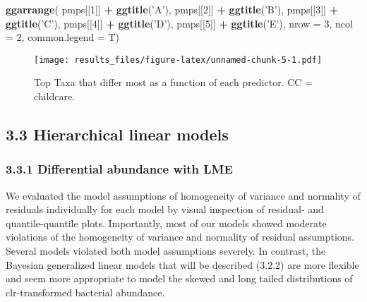 \documentclass[]{article}
\newenvironment{Shaded}{\begin{snugshade}}{\end{snugshade}}
\newcommand{\KeywordTok}[1]{\textcolor[rgb]{0.13,0.29,0.53}{\textbf{#1}}}
\newcommand{\DataTypeTok}[1]{\textcolor[rgb]{0.13,0.29,0.53}{#1}}
\newcommand{\DecValTok}[1]{\textcolor[rgb]{0.00,0.00,0.81}{#1}}
\newcommand{\StringTok}[1]{\textcolor[rgb]{0.31,0.60,0.02}{#1}}
\newcommand{\OperatorTok}[1]{\textcolor[rgb]{0.81,0.36,0.00}{\textbf{#1}}}
\newcommand{\NormalTok}[1]{#1}
\begin{document}
\begin{Shaded}
\begin{Highlighting}[]
\KeywordTok{ggarrange}\NormalTok{(}
\NormalTok{    pmps[[}\DecValTok{1}\NormalTok{]] }\OperatorTok{+}\StringTok{ }\KeywordTok{ggtitle}\NormalTok{(}\StringTok{'A'}\NormalTok{), }
\NormalTok{    pmps[[}\DecValTok{2}\NormalTok{]] }\OperatorTok{+}\StringTok{ }\KeywordTok{ggtitle}\NormalTok{(}\StringTok{'B'}\NormalTok{), }
\NormalTok{    pmps[[}\DecValTok{3}\NormalTok{]] }\OperatorTok{+}\StringTok{ }\KeywordTok{ggtitle}\NormalTok{(}\StringTok{'C'}\NormalTok{), }
\NormalTok{    pmps[[}\DecValTok{4}\NormalTok{]] }\OperatorTok{+}\StringTok{ }\KeywordTok{ggtitle}\NormalTok{(}\StringTok{'D'}\NormalTok{), }
\NormalTok{    pmps[[}\DecValTok{5}\NormalTok{]] }\OperatorTok{+}\StringTok{ }\KeywordTok{ggtitle}\NormalTok{(}\StringTok{'E'}\NormalTok{),}
    \DataTypeTok{nrow =} \DecValTok{3}\NormalTok{, }\DataTypeTok{ncol =} \DecValTok{2}\NormalTok{, }\DataTypeTok{common.legend =}\NormalTok{ T)}
\end{Highlighting}
\end{Shaded}

\begin{figure}
\centering
\texttt{[image: results\_files/figure-latex/unnamed-chunk-5-1.pdf]}
\caption{Top Taxa that differ most as a function of each predictor. CC =
childcare.}
\end{figure}

\subsection{3.3 Hierarchical linear
models}\label{hierarchical-linear-models}

\subsubsection{3.3.1 Differential abundance with
LME}\label{differential-abundance-with-lme}

We evaluated the model assumptions of homogeneity of variance and
normality of residuals individually for each model by visual inspection
of residual- and quantile-quantile plots. Importantly, most of our
models showed moderate violations of the homogeneity of variance and
normality of residual assumptions. Several models violated both model
assumptions severely. In contrast, the Bayesian generalized linear
models that will be described (3.2.2) are more flexible and seem more
appropriate to model the skewed and long tailed distributions of
clr-transformed bacterial abundance.
\end{document}

